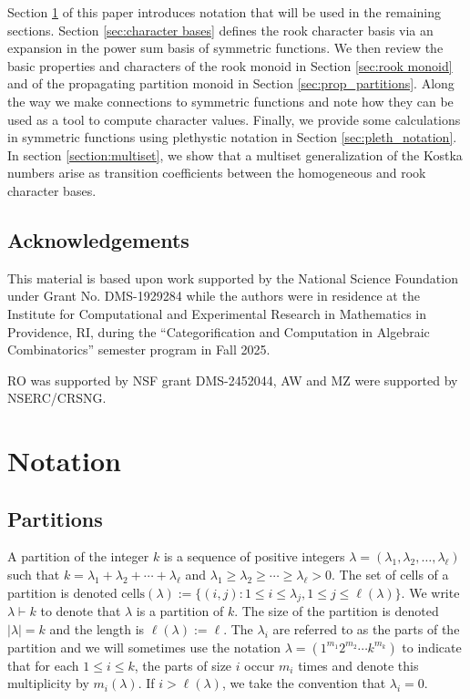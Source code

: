 \documentclass{amsart}
\theoremstyle{definition}
\begin{document}
Section \ref{sec:notation} of this paper introduces notation that will be used in
the remaining sections. Section \ref{sec:character bases} defines the rook character basis
via an expansion in the power sum basis of symmetric functions.
We then review the basic properties and characters of the rook monoid in Section \ref{sec:rook monoid} and of the propagating partition monoid in Section \ref{sec:prop_partitions}.
Along the way we make connections to symmetric functions and note how they can be used as a tool
to compute character values.  Finally, we provide some calculations in symmetric
functions using plethystic notation in Section \ref{sec:pleth_notation}.
In section \ref{section:multiset}, we show that a multiset generalization of the Kostka numbers arise as transition coefficients between the homogeneous and rook character bases. 


\subsection{Acknowledgements} 
This material is based upon work supported by the National Science Foundation under Grant No. DMS-1929284 while the authors were in residence at the Institute for Computational and Experimental Research in Mathematics in Providence, RI, during the “Categorification and Computation in Algebraic Combinatorics” semester program in Fall 2025.

RO was supported by NSF grant DMS-2452044, AW and MZ were supported by NSERC/CRSNG.

\section{Notation}
\label{sec:notation}

\subsection{Partitions}\label{subsec:partitions}
A partition of the integer $k$ is a sequence of positive integers $\lambda = (\lambda_1, \lambda_2, \ldots, \lambda_\ell)$
such that $k = \lambda_1 + \lambda_2+\cdots+ \lambda_\ell$
and $\lambda_1 \geq \lambda_2 \geq \cdots \geq \lambda_\ell > 0$.
The set of cells of a partition is denoted
${\mathrm{cells}}(\lambda) := \{ (i,j) : 1 \leq i \leq \lambda_j, 1 \leq j \leq \ell(\lambda) \}$.
We write $\lambda\vdash k$ to denote that $\lambda$ is a partition of $k$.
The size of the partition is denoted $|\lambda| = k$
and the length is $\ell(\lambda) := \ell$.  The $\lambda_i$ are referred to as the parts of the
partition and we will sometimes use the notation $\lambda = (1^{m_1}2^{m_2}\cdots k^{m_k})$
to indicate that for each $1 \leq i \leq k$, the parts of size $i$ occur $m_i$ times and
denote this multiplicity by $m_i(\lambda)$.
If $i>\ell(\lambda)$, we take the convention that $\lambda_i=0$.
\end{document}
